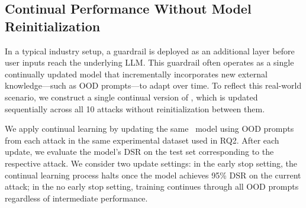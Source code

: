\subsection{Continual Performance Without Model Reinitialization}
In a typical industry setup, a guardrail is deployed as an additional layer before user inputs reach the underlying LLM. This guardrail often operates as a single continually updated model that incrementally incorporates new external knowledge—such as OOD prompts—to adapt over time. To reflect this real-world scenario, we construct a single continual version of \ourapp, which is updated sequentially across all 10 attacks without reinitialization between them.

We apply continual learning by updating the same \ourapp~model using OOD prompts from each attack in the same experimental dataset used in RQ2. After each update, we evaluate the model's DSR on the test set corresponding to the respective attack. We consider two update settings: in the early stop setting, the continual learning process halts once the model achieves 95\% DSR on the current attack; in the no early stop setting, training continues through all OOD prompts regardless of intermediate performance.

